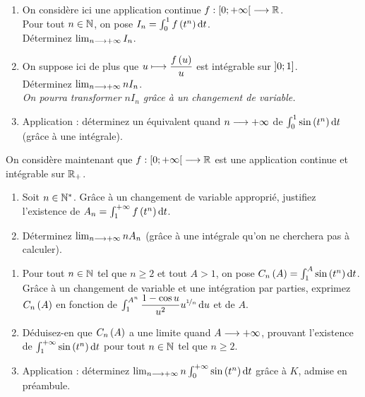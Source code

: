\setcounter{q}{0}
\begin{q}
\begin{enumerate}
    \item On considère ici une application continue \(f:\left[0;+\infty\right[\longrightarrow\mathbb{R}\). \\ Pour tout \(n\in\mathbb{N}\), on pose \(I_n=\int_0^1f\paren{t^n}\odif{t}\). \\ Déterminez \(\lim_{n\longrightarrow+\infty}I_n\). \\
    \item On suppose ici de plus que \(u\longmapsto\dfrac{f\left(u\right)}{u}\) est intégrable sur \(\left]0;1\right]\). \\ Déterminez \(\lim_{n\longrightarrow+\infty}nI_n\). \\ \textit{On pourra transformer \(nI_n\) grâce à un changement de variable.} \\
    \item Application : déterminez un équivalent quand \(n\longrightarrow+\infty\) de \(\int_0^1\sin\paren{t^n}\odif{t}\) (grâce à une intégrale).
\end{enumerate}
\end{q}

\begin{q}
On considère maintenant que \(f:\left[0;+\infty\right[\longrightarrow\mathbb{R}\) est une application continue et intégrable sur \(\mathbb{R}_+\).

\begin{enumerate}
    \item Soit \(n\in\mathbb{N}^*\). Grâce à un changement de variable approprié, justifiez l'existence de \(A_n=\int_1^{\pinf}f\paren{t^n}\odif{t}\). \\
    \item Déterminez \(\lim_{n\longrightarrow+\infty}nA_n\) (grâce à une intégrale qu'on ne cherchera pas à calculer).
\end{enumerate}
\end{q}

\begin{q}
\begin{enumerate}
    \item Pour tout \(n\in\mathbb{N}\) tel que \(n\geq2\) et tout \(A>1\), on pose \(C_n\paren{A}=\int_1^A\sin\paren{t^n}\odif{t}\). \\ Grâce à un changement de variable et une intégration par parties, exprimez \(C_n\left(A\right)\) en fonction de \(\int_1^{A^n}\dfrac{1-\cos u}{u^2}u^{\nicefrac{1}{n}}\odif{u}\) et de \(A\). \\
    \item Déduisez-en que \(C_n\left(A\right)\) a une limite quand \(A\longrightarrow+\infty\), prouvant l'existence de \(\int_1^{\pinf}\sin\paren{t^n}\odif{t}\) pour tout \(n\in\mathbb{N}\) tel que \(n\geq2\). \\
    \item Application : déterminez \(\lim_{n\to\pinf}n\int_0^{\pinf}\sin\paren{t^n}\odif{t}\) grâce à \(K\), admise en préambule.
\end{enumerate}
\end{q}

